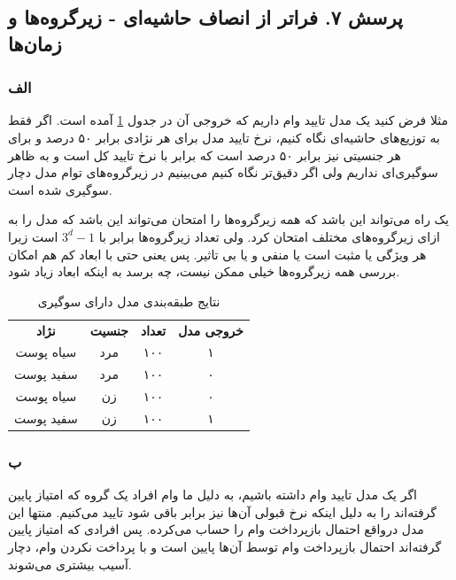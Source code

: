 \subsection{پرسش ۷. فراتر از انصاف حاشیه‌ای - زیرگروه‌ها و زمان‌ها}
\subsubsection{الف}
مثلا فرض کنید یک مدل تایید وام داریم که خروجی آن در جدول
\ref{tab:bg}
آمده است. اگر فقط به توزیع‌های حاشیه‌ای نگاه کنیم، نرخ تایید مدل برای هر نژادی برابر ۵۰ درصد و برای هر جنسیتی نیز برابر ۵۰ درصد است که برابر با نرخ تایید کل است و به ظاهر سوگیری‌ای نداریم ولی اگر دقیق‌تر نگاه کنیم می‌بینیم در زیرگروه‌های توام مدل دچار سوگیری شده است. 

یک راه می‌تواند این باشد که همه زیرگروه‌ها را امتحان می‌تواند این باشد که مدل را به ازای زیرگروه‌های مختلف امتحان کرد. ولی تعداد زیرگروه‌ها برابر با 
$3^d - 1$
است زیرا هر ویژگی یا مثبت است یا منفی و یا بی تاثیر. پس یعنی حتی با ابعاد کم هم امکان بررسی همه زیرگروه‌ها خیلی ممکن نیست، چه برسد به اینکه ابعاد زیاد شود.

        \begin{table}[htbp] \label{tab:bg}
	\centering
	\caption{ نتایج طبقه‌بندی مدل دارای سوگیری}
	\begin{tabular}{|c|c|c|c|}
		\hline
		\textbf{نژاد} & \textbf{جنسیت} & \textbf{تعداد} & \textbf{خروجی مدل} \\
		سیاه پوست & مرد & ۱۰۰ & ۱ \\
				سفید پوست & مرد  & ۱۰۰ & ۰ \\
						سیاه پوست & زن  & ۱۰۰ & ۰ \\
								سفید پوست & زن & ۱۰۰  & ۱ \\
								\hline
	\end{tabular}
\end{table}

\subsubsection{ب}
اگر یک مدل تایید وام داشته باشیم، به دلیل 
ما وام افراد یک گروه که امتیاز پایین گرفته‌اند را به دلیل اینکه نرخ قبولی آن‌ها نیز برابر باقی شود تایید می‌کنیم. منتها این مدل درواقع احتمال بازپرداخت وام را حساب می‌کرده. پس افرادی که امتیاز پایین گرفته‌اند احتمال بازپرداخت وام توسط آن‌ها پایین است و با پرداخت نکردن وام، دچار آسیب بیشتری می‌شوند.  

























